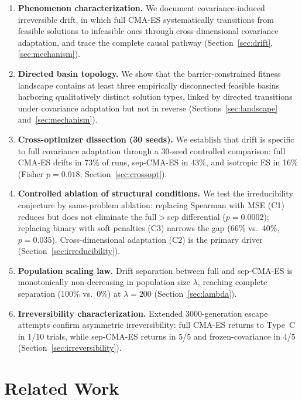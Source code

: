 \documentclass[twoside]{article}
\begin{document}
\begin{enumerate}
\item \textbf{Phenomenon characterization.} We document covariance-induced
  irreversible drift, in which full CMA-ES systematically transitions from
  feasible solutions to infeasible ones through cross-dimensional covariance
  adaptation, and trace the complete causal pathway (Section~\ref{sec:drift},
  \ref{sec:mechanism}).

\item \textbf{Directed basin topology.} We show that the
  barrier-constrained fitness landscape contains at least three
  empirically disconnected feasible basins harboring qualitatively
  distinct solution types, linked by directed transitions under
  covariance adaptation but not in reverse
  (Sections~\ref{sec:landscape} and~\ref{sec:mechanism}).

\item \textbf{Cross-optimizer dissection (30 seeds).} We establish that drift
  is specific to full covariance adaptation through a 30-seed controlled
  comparison: full CMA-ES drifts in 73\% of runs, sep-CMA-ES in 43\%,
  and isotropic ES in 16\% (Fisher $p = 0.018$; Section~\ref{sec:crossopt}).

\item \textbf{Controlled ablation of structural conditions.} We test the
  irreducibility conjecture by same-problem ablation: replacing Spearman with
  MSE (C1) reduces but does not eliminate the full$>$sep differential
  ($p = 0.0002$); replacing binary with soft penalties (C3) narrows the gap
  (66\% vs.\ 40\%, $p = 0.035$). Cross-dimensional adaptation (C2) is the
  primary driver (Section~\ref{sec:irreducibility}).

\item \textbf{Population scaling law.} Drift separation between full and
  sep-CMA-ES is monotonically non-decreasing in population size $\lambda$, reaching
  complete separation (100\% vs.\ 0\%) at $\lambda = 200$
  (Section~\ref{sec:lambda}).

\item \textbf{Irreversibility characterization.} Extended 3000-generation
  escape attempts confirm asymmetric irreversibility: full CMA-ES returns
  to Type~C in 1/10 trials, while sep-CMA-ES returns in 5/5 and
  frozen-covariance in 4/5 (Section~\ref{sec:irreversibility}).
\end{enumerate}

\section{Related Work}
\label{sec:related}
\end{document}
